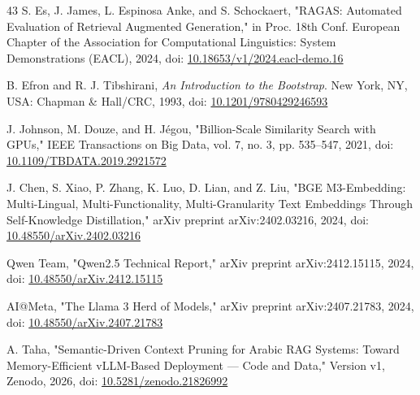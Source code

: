 \begin{thebibliography}{43}
 S. Es, J. James, L. Espinosa Anke, and S. Schockaert, "RAGAS: Automated Evaluation of Retrieval Augmented Generation," in Proc. 18th Conf. European Chapter of the Association for Computational Linguistics: System Demonstrations (EACL), 2024, doi: \href{https://doi.org/10.18653/v1/2024.eacl-demo.16}{10.18653/v1/2024.eacl-demo.16}

 B. Efron and R. J. Tibshirani, \textit{An Introduction to the Bootstrap}. New York, NY, USA: Chapman \& Hall/CRC, 1993, doi: \href{https://doi.org/10.1201/9780429246593}{10.1201/9780429246593}

 J. Johnson, M. Douze, and H. Jégou, "Billion-Scale Similarity Search with GPUs," IEEE Transactions on Big Data, vol. 7, no. 3, pp. 535--547, 2021, doi: \href{https://doi.org/10.1109/TBDATA.2019.2921572}{10.1109/TBDATA.2019.2921572}

 J. Chen, S. Xiao, P. Zhang, K. Luo, D. Lian, and Z. Liu, "BGE M3-Embedding: Multi-Lingual, Multi-Functionality, Multi-Granularity Text Embeddings Through Self-Knowledge Distillation," arXiv preprint arXiv:2402.03216, 2024, doi: \href{https://doi.org/10.48550/arXiv.2402.03216}{10.48550/arXiv.2402.03216}

 Qwen Team, "Qwen2.5 Technical Report," arXiv preprint arXiv:2412.15115, 2024, doi: \href{https://doi.org/10.48550/arXiv.2412.15115}{10.48550/arXiv.2412.15115}

 AI@Meta, "The Llama 3 Herd of Models," arXiv preprint arXiv:2407.21783, 2024, doi: \href{https://doi.org/10.48550/arXiv.2407.21783}{10.48550/arXiv.2407.21783}

 A. Taha, "Semantic-Driven Context Pruning for Arabic RAG Systems: Toward Memory-Efficient vLLM-Based Deployment --- Code and Data," Version v1, Zenodo, 2026, doi: \href{https://doi.org/10.5281/zenodo.21826992}{10.5281/zenodo.21826992}

\end{thebibliography}
